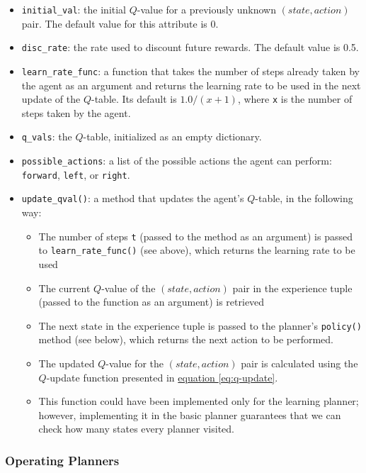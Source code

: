 \documentclass{article}
\begin{document}
\begin{itemize}
    \item \texttt{initial\_val}: the initial $Q$-value for a previously unknown $(state, action)$ pair. The default value for this attribute is 0.
    \item \texttt{disc\_rate}: the rate used to discount future rewards. The default value is 0.5.
    \item \texttt{learn\_rate\_func}: a function that takes the number of steps already taken by the agent as an argument and returns the learning rate to be used in the next update of the $Q$-table. Its default is $1.0 / (x + 1)$, where \texttt{x} is the number of steps taken by the agent.
    \item \texttt{q\_vals}: the $Q$-table, initialized as an empty dictionary.
    \item \texttt{possible\_actions}: a list of the possible actions the agent can perform: \texttt{forward}, \texttt{left}, or \texttt{right}.
    \item \texttt{update\_qval()}: a method that updates the agent's $Q$-table, in the following way:
    
    \begin{itemize}
        \item The number of steps \texttt{t} (passed to the method as an argument) is passed to \texttt{learn\_rate\_func()} (see above), which returns the learning rate to be used
        \item The current $Q$-value of the $(state, action)$ pair in the experience tuple (passed to the function as an argument) is retrieved
        \item The next state in the experience tuple is passed to the planner's \texttt{policy()} method (see below), which returns the next action to be performed.
        \item The updated $Q$-value for the $(state, action)$ pair is calculated using the $Q$-update function presented in \hyperref[eq:q-update]{equation \ref{eq:q-update}}.
        \item[] This function could have been implemented only for the learning planner; however, implementing it in the basic planner guarantees that we can check how many states every planner visited.
    \end{itemize}
\end{itemize}

\subsubsection{Operating Planners}
\end{document}
